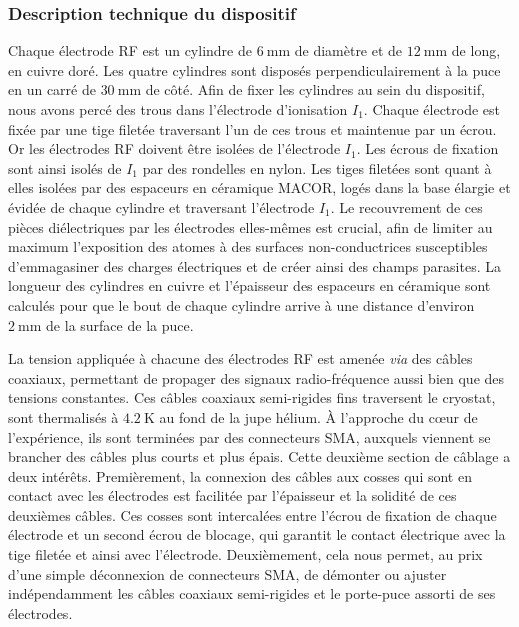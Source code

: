 \subsubsection*{Description technique du dispositif}
\noindent Chaque électrode RF est un cylindre de $\SI{6}{\mm}$ de diamètre et de $\SI{12}{\mm}$ de long, en cuivre doré.
Les quatre cylindres sont disposés perpendiculairement à la puce en un carré de $\SI{30}{\mm}$ de côté.
Afin de fixer les cylindres au sein du dispositif, nous avons percé des trous dans l'électrode d'ionisation $I_1$.
Chaque électrode est fixée par une tige filetée traversant l'un de ces trous et maintenue par un écrou.
Or les électrodes RF doivent être isolées de l'électrode $I_1$.
Les écrous de fixation sont ainsi isolés de $I_1$ par des rondelles en nylon.
Les tiges filetées sont quant à elles isolées par des espaceurs en céramique MACOR, logés dans la base élargie et évidée de chaque cylindre et traversant l'électrode $I_1$.
Le recouvrement de ces pièces diélectriques par les électrodes elles-mêmes est crucial, afin de limiter au maximum l'exposition des atomes à des surfaces non-conductrices susceptibles d'emmagasiner des charges électriques et de créer ainsi des champs parasites.
La longueur des cylindres en cuivre et l'épaisseur des espaceurs en céramique sont calculés pour que le bout de chaque cylindre arrive à une distance d'environ $\SI{2}{\mm}$ de la surface de la puce.

La tension appliquée à chacune des électrodes RF est amenée \textit{via} des câbles coaxiaux,  permettant de propager des signaux radio-fréquence aussi bien que des tensions constantes.
Ces câbles coaxiaux semi-rigides fins traversent le cryostat, sont thermalisés à $\SI{4.2}{\K}$ au fond de la jupe hélium.
\`A l'approche du c\oe ur de l'expérience, ils sont terminées par des connecteurs SMA, auxquels viennent se brancher des câbles plus courts et plus épais.
Cette deuxième section de câblage a deux intérêts.
Premièrement, la connexion des câbles aux cosses qui sont en contact avec les électrodes est facilitée par l'épaisseur et la solidité de ces deuxièmes câbles.
Ces cosses sont intercalées entre l'écrou de fixation de chaque électrode et un second écrou de blocage, qui garantit le contact électrique avec la tige filetée et ainsi avec l'électrode.
Deuxièmement, cela nous permet, au prix d'une simple déconnexion de connecteurs SMA, de démonter ou ajuster indépendamment les câbles coaxiaux semi-rigides et le porte-puce assorti de ses électrodes.

